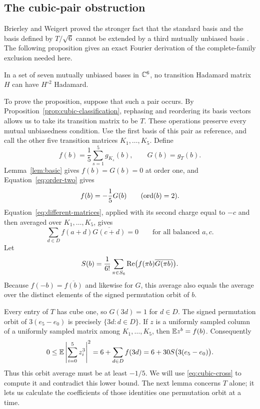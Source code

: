 \subsection{The cubic-pair obstruction}

Brierley and Weigert proved the stronger fact that the standard basis
and the basis defined by $T/\sqrt6$ cannot be extended by a third
mutually unbiased basis
\cite[Section~4.1 and Table~1]{BrierleyWeigert2009Constructing}.
The following proposition gives an exact Fourier derivation of the
complete-family exclusion needed here.

\begin{proposition}\label{prop:cubic-exclusion}
In a set of seven mutually unbiased bases in $\mathbb C^6$, no transition
Hadamard matrix $H$ can have $H^{\circ2}$ Hadamard.
\end{proposition}

To prove the proposition, suppose that such a pair occurs. By
Proposition~\ref{prop:cubic-classification}, rephasing and reordering
its basis vectors allows us to take its transition matrix to be $T$.
These operations preserve every mutual unbiasedness condition.
Use the first basis of this pair as reference, and call the other
five transition matrices $K_1,\ldots,K_5$. Define
\[
 f(b)=\frac15\sum_{s=1}^5g_{K_s}(b),\qquad G(b)=g_T(b).
\]
Lemma~\ref{lem:basic} gives $f(b)=G(b)=0$ at order one, and
Equation~\eqref{eq:order-two} gives
\begin{equation}\label{eq:cubic-order-two}
 f(b)=-\frac15G(b)\qquad(\operatorname{ord}(b)=2).
\end{equation}
Equation~\eqref{eq:different-matrices}, applied with its second charge
equal to $-c$ and then averaged over $K_1,\ldots,K_5$, gives
\begin{equation}\label{eq:cubic-cross}
 \sum_{d\in D}f(a+d)\overline{G(c+d)}=0
 \qquad\text{for all balanced }a,c.
\end{equation}
Let
\begin{equation}\label{eq:cubic-S}
 S(b)=\frac1{6!}\sum_{\pi\in S_6}
       \operatorname{Re}\bigl(f(\pi b)\overline{G(\pi b)}\bigr).
\end{equation}
Because $f(-b)=\overline{f(b)}$ and likewise for $G$, this average
also equals the average over the distinct elements of the signed
permutation orbit of $b$.

Every entry of $T$ has cube one, so $G(3d)=1$ for $d\in D$.
The signed permutation orbit of $3(e_5-e_0)$ is precisely
$\{3d:d\in D\}$. If $z$ is a uniformly sampled column of a uniformly
sampled matrix among $K_1,\ldots,K_5$, then $\mathbb E z^b=f(b)$. Consequently
\begin{equation}\label{eq:cubic-positivity}
 0\le\mathbb E\left|\sum_{i=0}^5z_i^3\right|^2
 =6+\sum_{d\in D}f(3d)
 =6+30S\bigl(3(e_5-e_0)\bigr).
\end{equation}
Thus this orbit average must be at least $-1/5$. We will use
\eqref{eq:cubic-cross} to compute it and contradict this lower bound.
The next lemma concerns $T$ alone; it lets us calculate the coefficients
of those identities one permutation orbit at a time.

